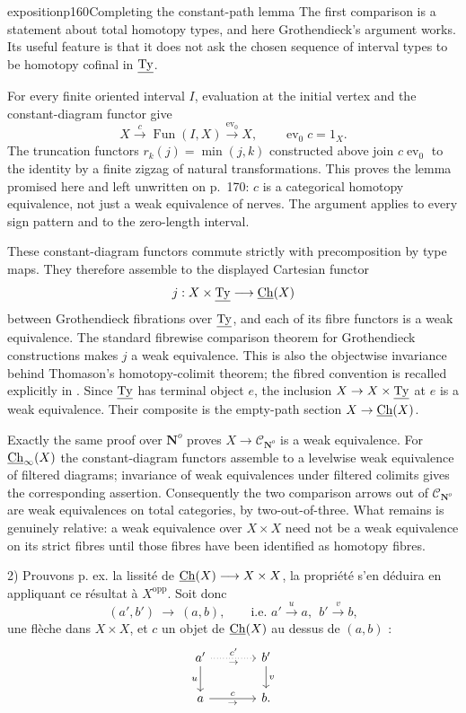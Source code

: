 \begin{dcomment}{exposition}{p160}{Completing the constant-path lemma}
The first comparison is a statement about total homotopy types, and here Grothendieck's argument works. Its useful feature is that it does not ask the chosen sequence of interval types to be homotopy cofinal in $\underline{\mathrm{Ty}}$.

For every finite oriented interval $I$, evaluation at the initial vertex and the constant-diagram functor give
\[
 X\xrightarrow{c}\operatorname{Fun}(I,X)
 \xrightarrow{\operatorname{ev}_0}X,
 \qquad \operatorname{ev}_0c=1_X.
\]
The truncation functors $r_k(j)=\min(j,k)$ constructed above join $c\operatorname{ev}_0$ to the identity by a finite zigzag of natural transformations. This proves the lemma promised here and left unwritten on p.~170: $c$ is a categorical homotopy equivalence, not just a weak equivalence of nerves. The argument applies to every sign pattern and to the zero-length interval.

These constant-diagram functors commute strictly with precomposition by type maps. They therefore assemble to the displayed Cartesian functor
\[
 j:X\times\underline{\mathrm{Ty}}\longrightarrow\underline{\mathrm{Ch}}(X)
\]
between Grothendieck fibrations over $\underline{\mathrm{Ty}}$, and each of its fibre functors is a weak equivalence. The standard fibrewise comparison theorem for Grothendieck constructions makes $j$ a weak equivalence. This is also the objectwise invariance behind Thomason's homotopy-colimit theorem; the fibred convention is recalled explicitly in \citet[\S1.5]{Shoikhet2016}. Since $\underline{\mathrm{Ty}}$ has terminal object $e$, the inclusion $X\to X\times\underline{\mathrm{Ty}}$ at $e$ is a weak equivalence. Their composite is the empty-path section $X\to\underline{\mathrm{Ch}}(X)$.

Exactly the same proof over $\mathbf N^o$ proves $X\to\mathcal C_{\mathbf N^o}$ is a weak equivalence. For $\underline{\mathrm{Ch}}_\infty(X)$ the constant-diagram functors assemble to a levelwise weak equivalence of filtered diagrams; invariance of weak equivalences under filtered colimits gives the corresponding assertion. Consequently the two comparison arrows out of $\mathcal C_{\mathbf N^o}$ are weak equivalences on total categories, by two-out-of-three. What remains is genuinely relative: a weak equivalence over $X\times X$ need not be a weak equivalence on its strict fibres until those fibres have been identified as homotopy fibres.
\end{dcomment}


2) Prouvons p. ex. la lissité de $\underline{\mathrm{Ch}}(X) \longrightarrow X \times X$, la propriété s'en déduira en appliquant ce résultat à $X^{\mathrm{opp}}$. Soit donc
\[
(a',b') \ \longrightarrow\ (a,b), \qquad \text{i.e. } a' \xrightarrow{u} a,\ \ b' \xrightarrow{v} b,
\]
une flèche dans $X \times X$, et $c$ un objet de $\underline{\mathrm{Ch}}(X)$ au dessus de $(a,b)$ :
\[
\begin{tikzcd}[column sep=large]
a' \ar[r,dotted,"c'","\scriptstyle\rightarrow"'] \ar[d,"u"'] & b' \ar[d,"v"] \\
a \ar[r,"c","\scriptstyle\rightarrow"'] & b.
\end{tikzcd}
\]

